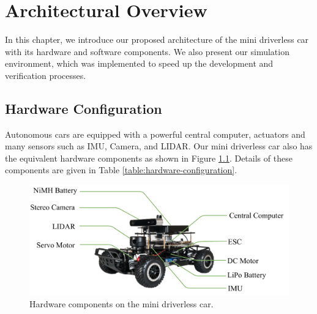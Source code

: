 \chapter{Architectural Overview}
\label{chp:b3}

In this chapter, we introduce our proposed architecture of the mini driverless
car with its hardware and software components. We also present our simulation
environment, which was implemented to speed up the development and
verification processes.

\section{Hardware Configuration}

Autonomous cars are equipped with a powerful central computer, actuators and
many sensors such as IMU, Camera, and LIDAR. Our mini driverless car also has
the equivalent hardware components as shown in Figure
\ref{figure:hardware-configuration}. Details of these components are given in
Table \ref{table:hardware-configuration}.

\begin{figure}[h]
\centering
\includegraphics[width=.8\textwidth]{figures/hardware-configuration.pdf}
\caption{Hardware components on the mini driverless car.}
\label{figure:hardware-configuration}
\end{figure}

